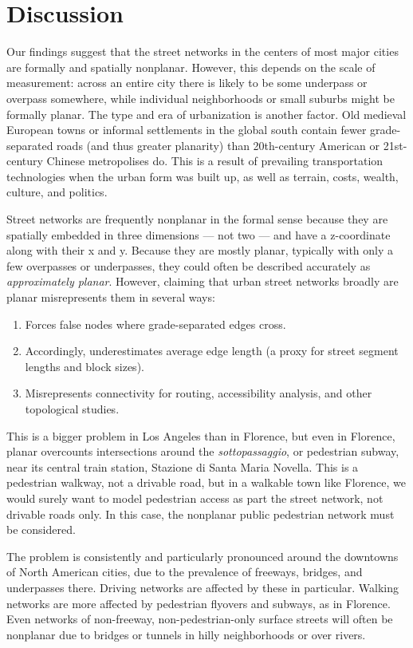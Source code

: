 \documentclass[Afour,sageh,times]{sagej}
\begin{document}
\section{Discussion}

Our findings suggest that the street networks in the centers of most major cities are formally and spatially nonplanar. However, this depends on the scale of measurement: across an entire city there is likely to be some underpass or overpass somewhere, while individual neighborhoods or small suburbs might be formally planar. The type and era of urbanization is another factor. Old medieval European towns or informal settlements in the global south contain fewer grade-separated roads (and thus greater planarity) than 20th-century American or 21st-century Chinese metropolises do. This is a result of prevailing transportation technologies when the urban form was built up, as well as terrain, costs, wealth, culture, and politics.

Street networks are frequently nonplanar in the formal sense because they are spatially embedded in three dimensions --- not two --- and have a z-coordinate along with their x and y. Because they are mostly planar, typically with only a few overpasses or underpasses, they could often be described accurately as \emph{approximately planar}. However, claiming that urban street networks broadly are planar misrepresents them in several ways:

\begin{enumerate}
	\item{Forces false nodes where grade-separated edges cross.}
	\item{Accordingly, underestimates average edge length (a proxy for street segment lengths and block sizes).}
	\item{Misrepresents connectivity for routing, accessibility analysis, and other topological studies.}
\end{enumerate}

This is a bigger problem in Los Angeles than in Florence, but even in Florence, planar overcounts intersections around the \textit{sottopassaggio}, or pedestrian subway, near its central train station, Stazione di Santa Maria Novella. This is a pedestrian walkway, not a drivable road, but in a walkable town like Florence, we would surely want to model pedestrian access as part the street network, not drivable roads only. In this case, the nonplanar public pedestrian network must be considered.

The problem is consistently and particularly pronounced around the downtowns of North American cities, due to the prevalence of freeways, bridges, and underpasses there. Driving networks are affected by these in particular. Walking networks are more affected by pedestrian flyovers and subways, as in Florence. Even networks of non-freeway, non-pedestrian-only surface streets will often be nonplanar due to bridges or tunnels in hilly neighborhoods or over rivers.
\end{document}
